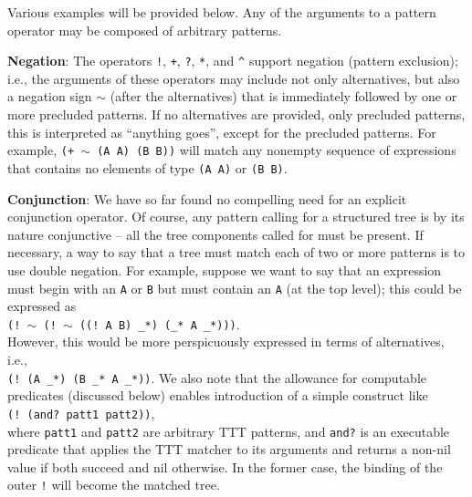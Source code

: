 \documentclass[a4,11pt]{article}
\begin{document}
Various examples will be provided below.
Any of the arguments to a pattern operator may be composed of arbitrary patterns. 

{\bf Negation}: 
The operators \texttt{!}, \texttt{+}, \texttt{?}, \texttt{*}, and \texttt{\^} support negation (pattern exclusion); i.e., the arguments of these operators may include not only alternatives, but also a negation sign \texttt{$\sim$} (after the alternatives) that is immediately followed by one or more precluded patterns. If no alternatives are provided, only precluded patterns, this is interpreted as ``anything goes'', except for the precluded patterns. For example, \texttt{(+ $\sim$ (A A) (B B))} will match any nonempty sequence of expressions that contains no elements of type \texttt{(A A)} or \texttt{(B B)}.


{\bf Conjunction}:
We have so far found no compelling need for an explicit conjunction operator. Of course, any pattern calling for a structured tree is by its nature conjunctive -- all the tree components called for must be present. If necessary, a way to say that a tree must match each of two or more patterns is to use double negation. For example, suppose we want to say that an expression must begin with an \texttt{A} or \texttt{B} but must contain an \texttt{A} (at the top level); this could be expressed as \\
\scriptsize
\hspace{1em} \texttt{(! $\sim$ (! $\sim$ ((! A B) \_*) (\_* A \_*)))}.\\
\normalsize
However, this would be more perspicuously expressed in terms of alternatives, i.e.,\\
\small
\hspace{1em}\texttt{(! (A \_*) (B \_* A \_*))}.  %
\normalsize
We also note that the allowance for computable predicates (discussed below) enables introduction of a simple construct like\\
\hspace{3em}\texttt{(! (and? patt1 patt2))},\\
 where \texttt{patt1} and \texttt{patt2} are arbitrary TTT patterns, and \texttt{and?} is an executable predicate that applies the TTT matcher to its arguments and returns a non-nil value if both succeed and nil otherwise. In the former case, the binding of the outer \texttt{!} will become the matched tree.
\end{document}
